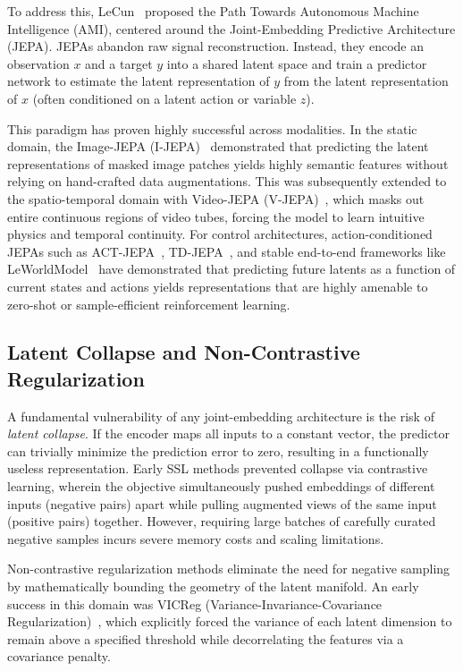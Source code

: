To address this, LeCun~\cite{lecun2022path} proposed the Path Towards Autonomous Machine Intelligence (AMI), centered around the Joint-Embedding Predictive Architecture (JEPA). JEPAs abandon raw signal reconstruction. Instead, they encode an observation $x$ and a target $y$ into a shared latent space and train a predictor network to estimate the latent representation of $y$ from the latent representation of $x$ (often conditioned on a latent action or variable $z$).

This paradigm has proven highly successful across modalities. In the static domain, the Image-JEPA (I-JEPA)~\cite{ijepa} demonstrated that predicting the latent representations of masked image patches yields highly semantic features without relying on hand-crafted data augmentations. This was subsequently extended to the spatio-temporal domain with Video-JEPA (V-JEPA)~\cite{vjepa2}, which masks out entire continuous regions of video tubes, forcing the model to learn intuitive physics and temporal continuity. For control architectures, action-conditioned JEPAs such as ACT-JEPA~\cite{actjepa}, TD-JEPA~\cite{bagatella2025td}, and stable end-to-end frameworks like LeWorldModel~\cite{Maes2026LeWorldModelSE} have demonstrated that predicting future latents as a function of current states and actions yields representations that are highly amenable to zero-shot or sample-efficient reinforcement learning.

\subsection{Latent Collapse and Non-Contrastive Regularization}

A fundamental vulnerability of any joint-embedding architecture is the risk of \textit{latent collapse}. If the encoder maps all inputs to a constant vector, the predictor can trivially minimize the prediction error to zero, resulting in a functionally useless representation. Early SSL methods prevented collapse via contrastive learning, wherein the objective simultaneously pushed embeddings of different inputs (negative pairs) apart while pulling augmented views of the same input (positive pairs) together. However, requiring large batches of carefully curated negative samples incurs severe memory costs and scaling limitations.

Non-contrastive regularization methods eliminate the need for negative sampling by mathematically bounding the geometry of the latent manifold. An early success in this domain was VICReg (Variance-Invariance-Covariance Regularization)~\cite{bardes2021vicreg}, which explicitly forced the variance of each latent dimension to remain above a specified threshold while decorrelating the features via a covariance penalty.

